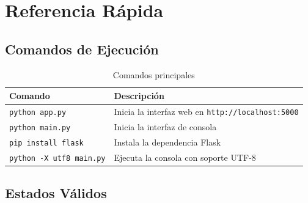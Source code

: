\documentclass[12pt, a4paper]{article}
\begin{document}
\newpage
\section{Referencia R\'apida}

\subsection{Comandos de Ejecuci\'on}

\begin{table}[H]
    \centering
    \begin{tabularx}{\textwidth}{l X}
        \toprule
        \textbf{Comando} & \textbf{Descripci\'on} \\
        \midrule
        \texttt{python app.py} & Inicia la interfaz web en \texttt{http://localhost:5000} \\
        \texttt{python main.py} & Inicia la interfaz de consola \\
        \texttt{pip install flask} & Instala la dependencia Flask \\
        \texttt{python -X utf8 main.py} & Ejecuta la consola con soporte UTF-8 \\
        \bottomrule
    \end{tabularx}
    \caption{Comandos principales}
\end{table}

\subsection{Estados V\'alidos}
\end{document}
